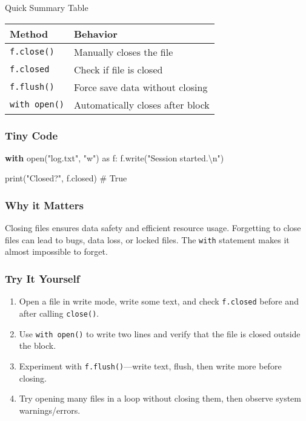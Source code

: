 \documentclass[
  letterpaper,
  DIV=11,
  numbers=noendperiod]{scrreprt}
\newenvironment{Shaded}{\begin{snugshade}}{\end{snugshade}}
\newcommand{\BuiltInTok}[1]{\textcolor[rgb]{0.00,0.23,0.31}{#1}}
\newcommand{\CharTok}[1]{\textcolor[rgb]{0.13,0.47,0.30}{#1}}
\newcommand{\CommentTok}[1]{\textcolor[rgb]{0.37,0.37,0.37}{#1}}
\newcommand{\ControlFlowTok}[1]{\textcolor[rgb]{0.00,0.23,0.31}{\textbf{#1}}}
\newcommand{\ImportTok}[1]{\textcolor[rgb]{0.00,0.46,0.62}{#1}}
\newcommand{\NormalTok}[1]{\textcolor[rgb]{0.00,0.23,0.31}{#1}}
\newcommand{\StringTok}[1]{\textcolor[rgb]{0.13,0.47,0.30}{#1}}
\providecommand{\tightlist}{%
  \setlength{\itemsep}{0pt}\setlength{\parskip}{0pt}}
\begin{document}
Quick Summary Table

\begin{longtable}[]{@{}ll@{}}
\toprule\noalign{}
Method & Behavior \\
\midrule\noalign{}
\endhead
\bottomrule\noalign{}
\endlastfoot
\texttt{f.close()} & Manually closes the file \\
\texttt{f.closed} & Check if file is closed \\
\texttt{f.flush()} & Force save data without closing \\
\texttt{with\ open()} & Automatically closes after block \\
\end{longtable}

\subsubsection{Tiny Code}\label{tiny-code-54}

\begin{Shaded}
\begin{Highlighting}[]
\ControlFlowTok{with} \BuiltInTok{open}\NormalTok{(}\StringTok{"log.txt"}\NormalTok{, }\StringTok{"w"}\NormalTok{) }\ImportTok{as}\NormalTok{ f:}
\NormalTok{    f.write(}\StringTok{"Session started.}\CharTok{\textbackslash{}n}\StringTok{"}\NormalTok{)}

\BuiltInTok{print}\NormalTok{(}\StringTok{"Closed?"}\NormalTok{, f.closed)  }\CommentTok{\# True}
\end{Highlighting}
\end{Shaded}

\subsubsection{Why it Matters}\label{why-it-matters-54}

Closing files ensures data safety and efficient resource usage.
Forgetting to close files can lead to bugs, data loss, or locked files.
The \texttt{with} statement makes it almost impossible to forget.

\subsubsection{Try It Yourself}\label{try-it-yourself-54}

\begin{enumerate}
\def\labelenumi{\arabic{enumi}.}
\tightlist
\item
  Open a file in write mode, write some text, and check
  \texttt{f.closed} before and after calling \texttt{close()}.
\item
  Use \texttt{with\ open()} to write two lines and verify that the file
  is closed outside the block.
\item
  Experiment with \texttt{f.flush()}---write text, flush, then write
  more before closing.
\item
  Try opening many files in a loop without closing them, then observe
  system warnings/errors.
\end{enumerate}
\end{document}
